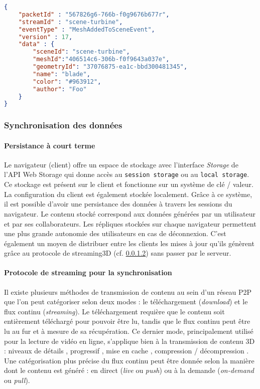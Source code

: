 \begin{lstlisting}[language=json,firstnumber=1,label=jsonstore,caption=Format
du Message transitant sur le réseau contenant l'événement MeshAddedToScene 
et ses 
paramètres]
{
	"packetId" : "567826g6-766b-f0g9676b677r",
	"streamId" : "scene-turbine",
	"eventType" : "MeshAddedToSceneEvent",
	"version" : 17,
	"data" : {
		"sceneId": "scene-turbine",
		"meshId":"406514c6-306b-f0f9643a037e",
		"geometryId": "37076875-ea1c-bbd300481345",
		"name": "blade",
		"color": "#963912",
		"author": "Foo"
	}
}
\end{lstlisting}


\subsubsection{Synchronisation des données}
\paragraph{Persistance à court terme}
Le navigateur (client) offre un espace de stockage avec l'interface \textit{Storage} 
de l'API Web Storage qui donne accès au \texttt{session storage} ou au  
\texttt{local storage}. Ce stockage est présent sur le client et fonctionne sur un 
système de clé / valeur. La configuration du client est également 
stockée localement. Grâce à ce système, il est possible d'avoir une 
persistance des données à travers les sessions du navigateur. Le contenu stocké 
correspond aux données générées par un utilisateur et par ses collaborateurs. Les 
répliques stockées sur chaque navigateur permettent une plus 
grande 
autonomie des utilisateurs en cas de déconnexion. C'est également un moyen de distribuer entre 
les clients les 
mises à jour qu'ils génèrent grâce au protocole de 
\gls{streaming3D} (cf. \ref{streamingprotocol}) sans passer par le serveur.

\paragraph{Protocole de streaming pour la synchronisation}
\label{streamingprotocol}

Il existe plusieurs méthodes de transmission de contenu au sein d'un réseau 
\gls{P2P} que l'on peut catégoriser selon deux modes : le téléchargement 
(\textit{download}) 
et le flux continu (\textit{streaming}). Le téléchargement requière que le contenu 
soit entièrement téléchargé pour pouvoir être lu, tandis que le flux continu peut 
être lu au fur et à mesure de sa récupération. Ce dernier mode, principalement 
utilisé pour la lecture de vidéo en ligne, s'applique bien à la transmission de 
contenu \gls{3D} : niveaux de détails \cite{Chu2012,Hu2008}, progressif 
\cite{Cheng2009,Limper2014}, mise en cache \cite{Jia2014}, compression / 
décompression
\cite{Lavoue2013,Ponchio2015,Maglo2013a}. 
Une catégorisation plus précise du flux continu peut être donnée selon la manière 
dont le contenu est généré : en direct (\textit{live} ou \textit{push}) ou à la demande 
(\textit{on-demand} ou \textit{pull}).  

